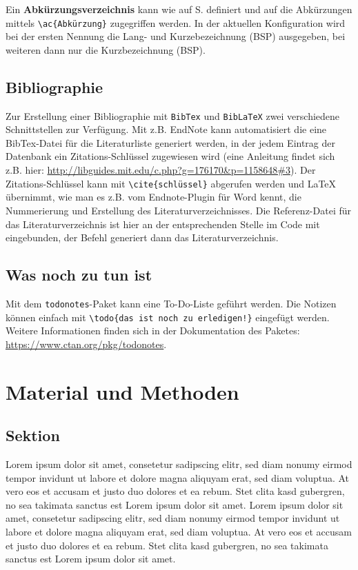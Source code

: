 \documentclass{scrreprt}
\begin{document}
Ein \textbf{Abkürzungsverzeichnis} kann wie auf S. \pageref{sec:abk_Verz} definiert und auf die Abkürzungen mittels \verb|\ac{Abkürzung}| zugegriffen werden. In der aktuellen Konfiguration wird bei der ersten Nennung die Lang- und Kurzebezeichnung (\ac{BSP}) ausgegeben, bei weiteren dann nur die Kurzbezeichnung (\ac{BSP}). 


\section{Bibliographie}

Zur Erstellung einer Bibliographie mit \verb|BibTex| und \verb|BibLaTeX| zwei verschiedene Schnittstellen zur Verfügung. Mit z.B. EndNote kann automatisiert die eine BibTex-Datei für die Literaturliste generiert werden, in der jedem Eintrag der Datenbank ein Zitations-Schlüssel zugewiesen wird (eine Anleitung findet sich z.B. hier: \url{http://libguides.mit.edu/c.php?g=176170&p=1158648#3}). Der Zitations-Schlüssel kann mit \verb|\cite{schlüssel}| abgerufen werden und LaTeX übernimmt, wie man es z.B. vom Endnote-Plugin für Word kennt, die Nummerierung und Erstellung des Literaturverzeichnisses. Die Referenz-Datei für das Literaturverzeichnis ist hier an der entsprechenden Stelle im Code mit \\ \verb|| eingebunden, der Befehl  \verb|| generiert dann das Literaturverzeichnis. 

\section{Was noch zu tun ist}
Mit dem \verb|todonotes|-Paket kann eine To-Do-Liste geführt werden. Die Notizen können einfach mit \verb|\todo{das ist noch zu erledigen!}| eingefügt werden. Weitere Informationen finden sich in der Dokumentation des Paketes: \url{https://www.ctan.org/pkg/todonotes}.


\chapter{Material und Methoden}\label{sec:materialmethoden}

\section{Sektion}\label{sec:Sektion1}
Lorem ipsum dolor sit amet, consetetur sadipscing elitr, sed diam nonumy eirmod tempor invidunt ut labore et dolore magna aliquyam erat, sed diam voluptua. At vero eos et accusam et justo duo dolores et ea rebum. Stet clita kasd gubergren, no sea takimata sanctus est Lorem ipsum dolor sit amet. Lorem ipsum dolor sit amet, consetetur sadipscing elitr, sed diam nonumy eirmod tempor invidunt ut labore et dolore magna aliquyam erat, sed diam voluptua. At vero eos et accusam et justo duo dolores et ea rebum. Stet clita kasd gubergren, no sea takimata sanctus est Lorem ipsum dolor sit amet.
\end{document}
